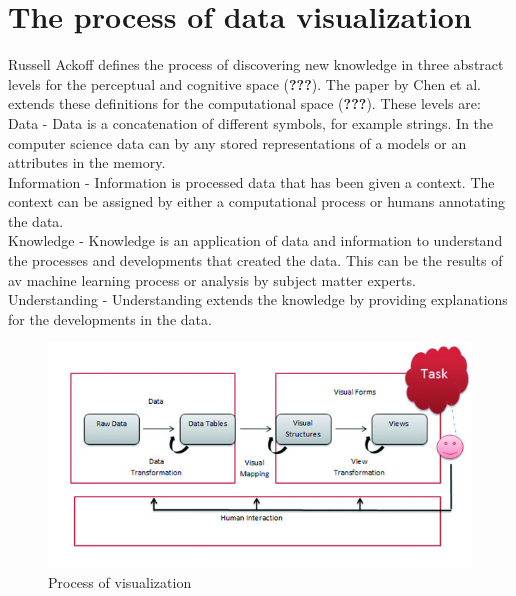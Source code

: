 \documentclass[american,a4paper,oneside,,tablecaptionabove]{scrbook}
\begin{document}
\section{The process of data
visualization}\label{the-process-of-data-visualization}

Russell Ackoff defines the process of discovering new knowledge in three
abstract levels for the perceptual and cognitive space ({\textbf{???}}).
The paper by Chen et al. extends these definitions for the computational
space ({\textbf{???}}). These levels are:\\
Data - Data is a concatenation of different symbols, for example
strings. In the computer science data can by any stored representations
of a models or an attributes in the memory.\\
Information - Information is processed data that has been given a
context. The context can be assigned by either a computational process
or humans annotating the data.\\
Knowledge - Knowledge is an application of data and information to
understand the processes and developments that created the data. This
can be the results of av machine learning process or analysis by subject
matter experts.\\
Understanding - Understanding extends the knowledge by providing
explanations for the developments in the data.

\begin{figure}
\centering
\includegraphics{images/krypczyk_diagrammarten_1.jpg}
\caption{Process of visualization}
\end{figure}
\end{document}

